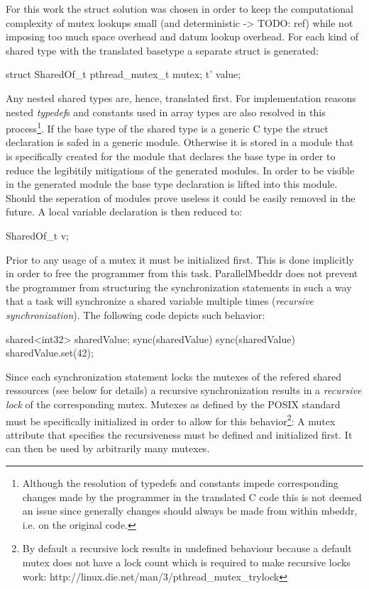For this work the struct solution was chosen in order to keep the computational complexity of mutex lookups small (and deterministic -> TODO: ref) while not imposing too much space overhead and datum lookup overhead. For each kind of shared type  with the translated basetype  a separate struct is generated:
\begin{ccode}
struct SharedOf_t {
  pthread_mutex_t mutex;
  t' value;
}
\end{ccode}
Any nested shared types are, hence, translated first. For implementation reasons nested \textit{typedef}s and constants used in array types are also resolved in this process\footnote{Although the resolution of typedefs and constants impede corresponding changes made by the programmer in the translated C code this is not deemed an issue since generally changes should always be made from within mbeddr, i.e. on the original code.}. If the base type of the shared type is a generic C type the struct declaration is safed in a generic module. Otherwise it is stored in a module that is specifically created for the module that declares the base type in order to reduce the legibitily mitigations of the generated modules. In order to be visible in the generated module the base type declaration is lifted into this module. Should the seperation of modules prove useless it could be easily removed in the future.
A local variable declaration  is then reduced to:
\begin{ccode}
SharedOf_t v;
\end{ccode}
Prior to any usage of a mutex it must be initialized first. This is done implicitly in order to free the programmer from this task. 
ParallelMbeddr does not prevent the programmer from structuring the synchronization statements in such a way that a task will synchronize a shared variable multiple times (\textit{recursive synchronization}). The following code depicts such behavior:
\begin{ccode}
shared<int32> sharedValue;
sync(sharedValue) {
  sync(sharedValue) {
    sharedValue.set(42);
  }
}
\end{ccode}
Since each synchronization statement locks the mutexes of the refered shared ressources (see below for details) a recursive synchronization results in a \textit{recursive lock} of the corresponding mutex. Mutexes as defined by the POSIX standard must be specifically initialized in order to allow for this behavior\footnote{By default a recursive lock results in undefined behaviour because a default mutex does not have a lock count which is required to make recursive locks work: http://linux.die.net/man/3/pthread\_mutex\_trylock}: A mutex attribute that specifies the recursiveness must be defined and initialized first. It can then be used by arbitrarily many mutexes. 

